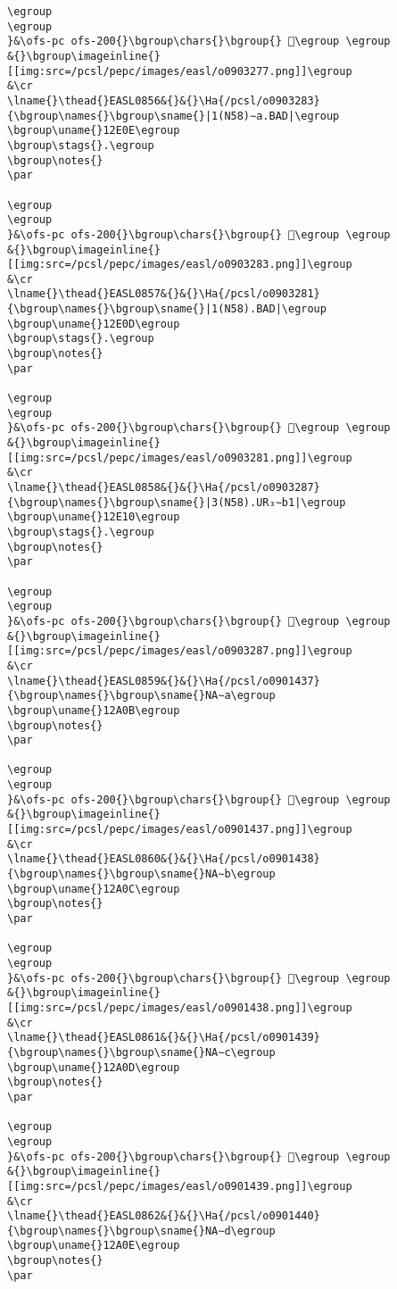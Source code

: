 \begin{verbatim}
\egroup
\egroup
}&\ofs-pc ofs-200{}\bgroup\chars{}\bgroup{} 𒸌\egroup \egroup
&{}\bgroup\imageinline{}[[img:src=/pcsl/pepc/images/easl/o0903277.png]]\egroup
&\cr
\lname{}\thead{}EASL0856&{}&{}\Ha{/pcsl/o0903283}{\bgroup\names{}\bgroup\sname{}|1(N58)∼a.BAD|\egroup
\bgroup\uname{}12E0E\egroup
\bgroup\stags{}.\egroup
\bgroup\notes{}
\par 

\egroup
\egroup
}&\ofs-pc ofs-200{}\bgroup\chars{}\bgroup{} 𒸎\egroup \egroup
&{}\bgroup\imageinline{}[[img:src=/pcsl/pepc/images/easl/o0903283.png]]\egroup
&\cr
\lname{}\thead{}EASL0857&{}&{}\Ha{/pcsl/o0903281}{\bgroup\names{}\bgroup\sname{}|1(N58).BAD|\egroup
\bgroup\uname{}12E0D\egroup
\bgroup\stags{}.\egroup
\bgroup\notes{}
\par 

\egroup
\egroup
}&\ofs-pc ofs-200{}\bgroup\chars{}\bgroup{} 𒸍\egroup \egroup
&{}\bgroup\imageinline{}[[img:src=/pcsl/pepc/images/easl/o0903281.png]]\egroup
&\cr
\lname{}\thead{}EASL0858&{}&{}\Ha{/pcsl/o0903287}{\bgroup\names{}\bgroup\sname{}|3(N58).UR₃∼b1|\egroup
\bgroup\uname{}12E10\egroup
\bgroup\stags{}.\egroup
\bgroup\notes{}
\par 

\egroup
\egroup
}&\ofs-pc ofs-200{}\bgroup\chars{}\bgroup{} 𒸐\egroup \egroup
&{}\bgroup\imageinline{}[[img:src=/pcsl/pepc/images/easl/o0903287.png]]\egroup
&\cr
\lname{}\thead{}EASL0859&{}&{}\Ha{/pcsl/o0901437}{\bgroup\names{}\bgroup\sname{}NA∼a\egroup
\bgroup\uname{}12A0B\egroup
\bgroup\notes{}
\par 

\egroup
\egroup
}&\ofs-pc ofs-200{}\bgroup\chars{}\bgroup{} 𒨋\egroup \egroup
&{}\bgroup\imageinline{}[[img:src=/pcsl/pepc/images/easl/o0901437.png]]\egroup
&\cr
\lname{}\thead{}EASL0860&{}&{}\Ha{/pcsl/o0901438}{\bgroup\names{}\bgroup\sname{}NA∼b\egroup
\bgroup\uname{}12A0C\egroup
\bgroup\notes{}
\par 

\egroup
\egroup
}&\ofs-pc ofs-200{}\bgroup\chars{}\bgroup{} 𒨌\egroup \egroup
&{}\bgroup\imageinline{}[[img:src=/pcsl/pepc/images/easl/o0901438.png]]\egroup
&\cr
\lname{}\thead{}EASL0861&{}&{}\Ha{/pcsl/o0901439}{\bgroup\names{}\bgroup\sname{}NA∼c\egroup
\bgroup\uname{}12A0D\egroup
\bgroup\notes{}
\par 

\egroup
\egroup
}&\ofs-pc ofs-200{}\bgroup\chars{}\bgroup{} 𒨍\egroup \egroup
&{}\bgroup\imageinline{}[[img:src=/pcsl/pepc/images/easl/o0901439.png]]\egroup
&\cr
\lname{}\thead{}EASL0862&{}&{}\Ha{/pcsl/o0901440}{\bgroup\names{}\bgroup\sname{}NA∼d\egroup
\bgroup\uname{}12A0E\egroup
\bgroup\notes{}
\par 


\end{verbatim}
